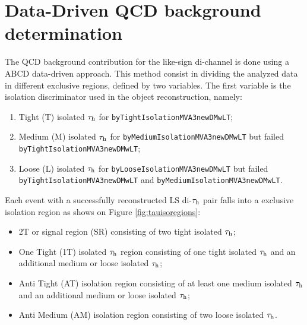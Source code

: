 \clearpage



\section {Data-Driven QCD background determination} \label{sec:bgestimation}
\FloatBarrier


The QCD background contribution for the like-sign di-\hadtau channel is done using a ABCD data-driven approach. This method consist in dividing the analyzed data in different exclusive regions, defined by two variables. The first variable is the \hadtau isolation discriminator used in the object reconstruction, namely:
 	
 	
 	\begin{enumerate}
 		\item Tight (T) isolated $\tau_{\text{h}}$ for \texttt{byTight\-Isolation\-MVA3\-newDMwLT};
 		\item Medium (M) isolated $\tau_{\text{h}}$ for \texttt{byMedium\-Isolation\-MVA3\-newDMwLT} but failed \texttt{byTight\-Isolation\-MVA3\-newDMwLT};
 		\item Loose (L) isolated $\tau_{\text{h}}$  for \texttt{byLoose\-Isolation\-MVA3\-newDMwLT} but failed \texttt{byTight\-Isolation\-MVA3\-newDMwLT} and \texttt{byMedium\-Isolation\-MVA3\-newDMwLT}.
 	\end{enumerate}
 	
Each event with a successfully reconstructed LS di-$\tau_{\text{h}}$ pair falls into a exclusive isolation region as shows on Figure \ref{fig:tauisoregions}:
 	
 	\begin{itemize}
 		\item 2T or signal region (SR) consisting of two tight isolated $\tau_{\text{h}}$;
 		\item One Tight (1T) isolated $\tau_{\text{h}}$ region consisting of one tight isolated $\tau_{\text{h}}$ and an additional medium or loose isolated $\tau_{\text{h}}$;
 		\item  Anti Tight (AT) isolation region consisting of at least one medium isolated $\tau_{\text{h}}$ and an additional medium or loose isolated $\tau_{\text{h}}$;
 		\item  Anti Medium (AM) isolation region consisting of two loose isolated $\tau_{\text{h}}$.
 	\end{itemize}
 
